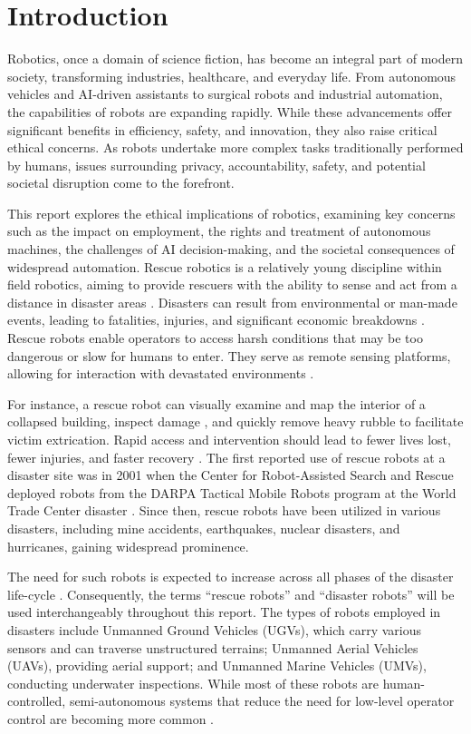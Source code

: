 \section{Introduction}

Robotics, once a domain of science fiction, has become an integral part of modern society, transforming industries, healthcare, and everyday life. From autonomous vehicles and AI-driven assistants to surgical robots and industrial automation, the capabilities of robots are expanding rapidly. While these advancements offer significant benefits in efficiency, safety, and innovation, they also raise critical ethical concerns. As robots undertake more complex tasks traditionally performed by humans, issues surrounding privacy, accountability, safety, and potential societal disruption come to the forefront. 

This report explores the ethical implications of robotics, examining key concerns such as the impact on employment, the rights and treatment of autonomous machines, the challenges of AI decision-making, and the societal consequences of widespread automation. Rescue robotics is a relatively young discipline within field robotics, aiming to provide rescuers with the ability to sense and act from a distance in disaster areas . Disasters can result from environmental or man-made events, leading to fatalities, injuries, and significant economic breakdowns . Rescue robots enable operators to access harsh conditions that may be too dangerous or slow for humans to enter. They serve as remote sensing platforms, allowing for interaction with devastated environments \cite{adams2014, kochersberger2014,}. 

For instance, a rescue robot can visually examine and map the interior of a collapsed building, inspect damage , and quickly remove heavy rubble to facilitate victim extrication. Rapid access and intervention should lead to fewer lives lost, fewer injuries, and faster recovery \cite{murphy2014}. The first reported use of rescue robots at a disaster site was in 2001 when the Center for Robot-Assisted Search and Rescue deployed robots from the DARPA Tactical Mobile Robots program at the World Trade Center disaster . Since then, rescue robots have been utilized in various disasters, including mine accidents, earthquakes, nuclear disasters, and hurricanes, gaining widespread prominence. 

The need for such robots is expected to increase across all phases of the disaster life-cycle \cite{murphy2014}. Consequently, the terms “rescue robots” and “disaster robots” will be used interchangeably throughout this report. The types of robots employed in disasters include Unmanned Ground Vehicles (UGVs), which carry various sensors and can traverse unstructured terrains; Unmanned Aerial Vehicles (UAVs), providing aerial support; and Unmanned Marine Vehicles (UMVs), conducting underwater inspections. While most of these robots are human-controlled, semi-autonomous systems that reduce the need for low-level operator control are becoming more common \cite{delmerico2019, zuzanek2014}. 

